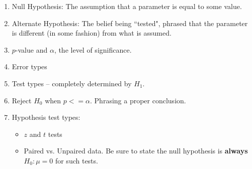 \documentclass{article}
\begin{document}
\begin{enumerate}
\begin{enumerate}
            \item Null Hypothesis: The assumption that a parameter is equal to some value.
            
            \item Alternate Hypothesis: The belief being ``tested", phrased that the parameter is different (in some fashion) from what is assumed.
            
            \item $p$-value and $\alpha$, the level of significance.
            
            \item Error types
            
            \item Test types -- completely determined by $H_1$.
            
            \item Reject $H_0$ when $p <= \alpha$. Phrasing a proper conclusion.
            
            \item Hypothesis test types:
            
                \begin{itemize}
                
                \item $z$ and $t$ tests
                
                \item Paired vs. Unpaired data. Be sure to state the null hypothesis is \textbf{always} $H_0: \mu = 0$ for such tests.
                
                \end{itemize}
                
        \end{enumerate}
        
\end{enumerate}
\end{document}
